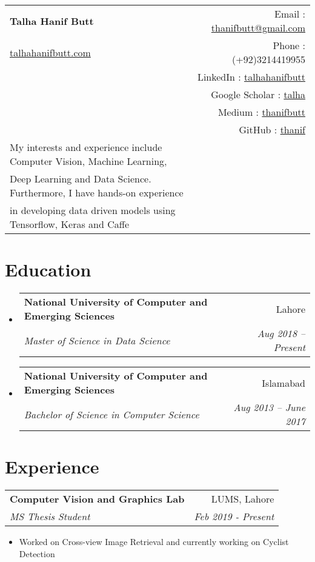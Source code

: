 \documentclass[letterpaper,11pt]{article}
\makeatletter
\newcommand{\resumeSubheading}[4]{
  \vspace{-1pt}\item
    \begin{tabular*}{0.97\textwidth}[t]{l@{\extracolsep{\fill}}r}
      \textbf{#1} & #2 \\
      \textit{\small#3} & \textit{\small #4} \\
    \end{tabular*}\vspace{-5pt}
}
\newcommand{\resumeSubHeadingListStart}{\begin{itemize}[leftmargin=*]}
\newcommand{\resumeSubHeadingListEnd}{\end{itemize}}
\makeatother
\begin{document}
\begin{tabular*}{\textwidth}{l@{\extracolsep{\fill}}r}
  \textbf{{\Large Talha Hanif Butt}} & Email : \href{mailto:thanifbutt@gmail.com}{thanifbutt@gmail.com}\\
  \href{https://sites.google.com/view/talhahanifbutt}{talhahanifbutt.com}& Phone : {(+92)3214419955}\\ & LinkedIn : \href{https://pk.linkedin.com/in/talhahanifbutt}{talhahanifbutt}\\
& Google Scholar : \href{https://scholar.google.com/citations?hl=en&user=2OZ4dKsAAAAJ}{talha}\\
& Medium : \href{https://medium.com/@thanifbutt}{thanifbutt}\\  
& GitHub : \href{https://github.com/thanif}{thanif}\\


My interests and experience include Computer Vision, Machine Learning,\\Deep
Learning and Data Science. Furthermore, I have hands-on experience\\in developing data  driven models using Tensorflow, Keras and Caffe

\end{tabular*}


\section{Education}
  \resumeSubHeadingListStart
    \resumeSubheading
      {National University of Computer and Emerging Sciences}{Lahore}
      {Master of Science in Data Science}{Aug 2018 -- Present}
    \resumeSubheading
      {National University of Computer and Emerging Sciences}{Islamabad}
      {Bachelor of Science in Computer Science}{Aug 2013 -- June 2017}
  \resumeSubHeadingListEnd


\section{Experience}

			\resumeSubheading
      			{Computer Vision and Graphics Lab}{LUMS, Lahore}
      			{MS Thesis Student}{Feb 2019 - Present}
      
        
          \begin{itemize}
  				\item Worked on Cross-view Image Retrieval and currently working on Cyclist Detection
			\end{itemize}
\end{document}
